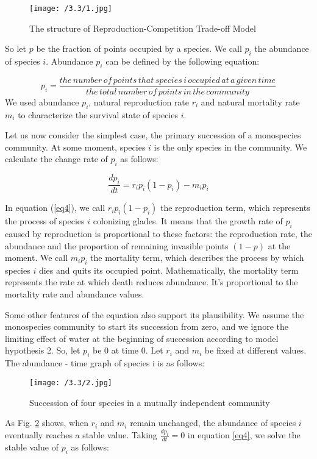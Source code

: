 \documentclass{mcmthesis}
\begin{document}
\begin{figure}[h]
	\centering
	\texttt{[image: /3.3/1.jpg]}
	\caption{The structure of Reproduction-Competition Trade-off Model} 
	\label{competetion}
\end{figure}

So let $p$ be the fraction of points occupied by a species. We call $p_i$ the abundance of species $i$. Abundance $p_i$ can be defined by the following equation:

\begin{equation}
	\label{eq3}
	p_i = \frac{the \,number \,of \,points\, that \,species \,i\, occupied \,at\, a\, given\, time}{the \,total \,number \,of\, points\, in\, the\, community}
\end{equation}
We used abundance $p_i$, natural reproduction rate $r_i$ and natural mortality rate $m_i$ to characterize the survival state of species $i$.

Let us now consider the simplest case, the primary succession of a monospecies community. At some moment, species $i$ is the only species in the community. We calculate the change rate of $p_i$ as follows:

\begin{equation}
	\label{eq4}
	\frac{dp_i}{dt}=r_ip_i(1-p_i)-m_ip_i
\end{equation}

In equation (\ref{eq4}), we call $r_ip_i(1-p_i)$ the reproduction term, which represents the process of species $i$ colonizing glades. It means that the growth rate of $p_i$ caused by reproduction is proportional to these factors: the reproduction rate, the abundance and the proportion of remaining invasible points $(1-p)$ at the moment. We call $m_ip_i$ the mortality term, which describes the process by which species $i$ dies and quits its occupied point. Mathematically, the mortality term represents the rate at which death reduces abundance. It’s proportional to the mortality rate and abundance values.

Some other features of the equation also support its plausibility. We assume the monospecies community to start its succession from zero, and we ignore the limiting effect of water at the beginning of succession according to model hypothesis 2. So, let $p_i$ be 0 at time 0. Let $r_i$ and $m_i$ be fixed at different values. The abundance - time graph of species i is as follows:

\begin{figure}[h]
	\centering
	\texttt{[image: /3.3/2.jpg]}
	\caption{Succession of four species in a mutually independent community } 
	\label{balance}
\end{figure}
As Fig. \ref{balance} shows, when $r_i$ and $m_i$ remain unchanged, the abundance of species $i$ eventually reaches a stable value. Taking $\frac{dp_i}{dt}=0$ in equation \ref{eq4}, we solve the stable value of $p_i$  as follows:
\end{document}
